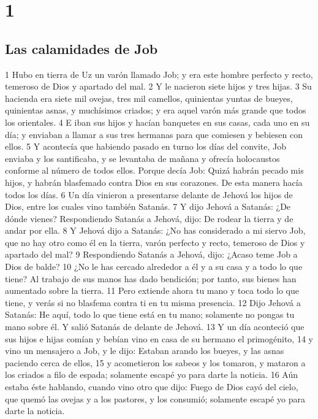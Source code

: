 
\chapter{1}

\section*{Las calamidades de Job}

1 Hubo en tierra de Uz un varón llamado Job; y era este hombre perfecto y recto, temeroso de Dios y apartado del mal.
2 Y le nacieron siete hijos y tres hijas.
3 Su hacienda era siete mil ovejas, tres mil camellos, quinientas yuntas de bueyes, quinientas asnas, y muchísimos criados; y era aquel varón más grande que todos los orientales.
4 E iban sus hijos y hacían banquetes en sus casas, cada uno en su día; y enviaban a llamar a sus tres hermanas para que comiesen y bebiesen con ellos.
5 Y acontecía que habiendo pasado en turno los días del convite, Job enviaba y los santificaba, y se levantaba de mañana y ofrecía holocaustos conforme al número de todos ellos. Porque decía Job: Quizá habrán pecado mis hijos, y habrán blasfemado contra Dios en sus corazones. De esta manera hacía todos los días.
6 Un día vinieron a presentarse delante de Jehová los hijos de Dios, entre los cuales vino también Satanás.
7 Y dijo Jehová a Satanás: ¿De dónde vienes? Respondiendo Satanás a Jehová, dijo: De rodear la tierra y de andar por ella. 
8 Y Jehová dijo a Satanás: ¿No has considerado a mi siervo Job, que no hay otro como él en la tierra, varón perfecto y recto, temeroso de Dios y apartado del mal?
9 Respondiendo Satanás a Jehová, dijo: ¿Acaso teme Job a Dios de balde?
10 ¿No le has cercado alrededor a él y a su casa y a todo lo que tiene? Al trabajo de sus manos has dado bendición; por tanto, sus bienes han aumentado sobre la tierra.
11 Pero extiende ahora tu mano y toca todo lo que tiene, y verás si no blasfema contra ti en tu misma presencia. 
12 Dijo Jehová a Satanás: He aquí, todo lo que tiene está en tu mano; solamente no pongas tu mano sobre él. Y salió Satanás de delante de Jehová.
13 Y un día aconteció que sus hijos e hijas comían y bebían vino en casa de su hermano el primogénito,
14 y vino un mensajero a Job, y le dijo: Estaban arando los bueyes, y las asnas paciendo cerca de ellos,
15 y acometieron los sabeos y los tomaron, y mataron a los criados a filo de espada; solamente escapé yo para darte la noticia.
16 Aún estaba éste hablando, cuando vino otro que dijo: Fuego de Dios cayó del cielo, que quemó las ovejas y a los pastores, y los consumió; solamente escapé yo para darte la noticia.
